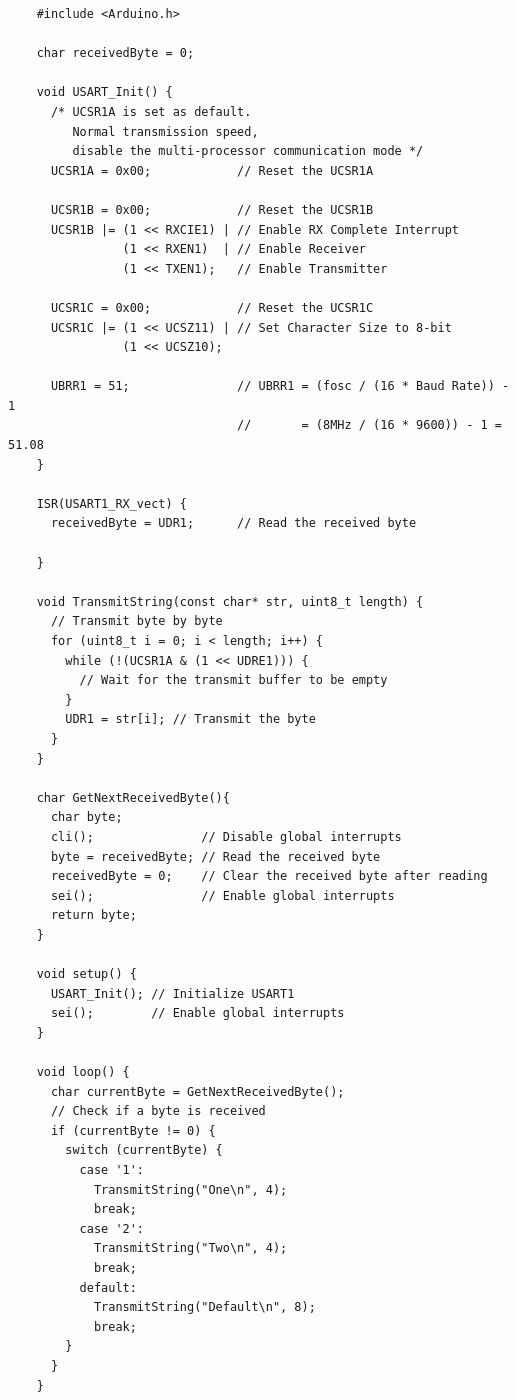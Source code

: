 \documentclass{article}
\begin{document}
\begin{verbatim}
    #include <Arduino.h>

    char receivedByte = 0;
    
    void USART_Init() {
      /* UCSR1A is set as default. 
         Normal transmission speed, 
         disable the multi-processor communication mode */
      UCSR1A = 0x00;            // Reset the UCSR1A
    
      UCSR1B = 0x00;            // Reset the UCSR1B
      UCSR1B |= (1 << RXCIE1) | // Enable RX Complete Interrupt
                (1 << RXEN1)  | // Enable Receiver
                (1 << TXEN1);   // Enable Transmitter
    
      UCSR1C = 0x00;            // Reset the UCSR1C
      UCSR1C |= (1 << UCSZ11) | // Set Character Size to 8-bit
                (1 << UCSZ10);
                
      UBRR1 = 51;               // UBRR1 = (fosc / (16 * Baud Rate)) - 1
                                //       = (8MHz / (16 * 9600)) - 1 = 51.08
    }
    
    ISR(USART1_RX_vect) {
      receivedByte = UDR1;      // Read the received byte
      
    }
    
    void TransmitString(const char* str, uint8_t length) {
      // Transmit byte by byte
      for (uint8_t i = 0; i < length; i++) {
        while (!(UCSR1A & (1 << UDRE1))) {
          // Wait for the transmit buffer to be empty
        }
        UDR1 = str[i]; // Transmit the byte
      }
    }
    
    char GetNextReceivedByte(){
      char byte;
      cli();               // Disable global interrupts
      byte = receivedByte; // Read the received byte
      receivedByte = 0;    // Clear the received byte after reading
      sei();               // Enable global interrupts
      return byte;
    }
    
    void setup() {
      USART_Init(); // Initialize USART1
      sei();        // Enable global interrupts
    }
    
    void loop() {
      char currentByte = GetNextReceivedByte();
      // Check if a byte is received
      if (currentByte != 0) {
        switch (currentByte) {
          case '1':
            TransmitString("One\n", 4);
            break;
          case '2':
            TransmitString("Two\n", 4);
            break;
          default:
            TransmitString("Default\n", 8);
            break;
        }
      }
    }    
\end{verbatim}
\end{document}
